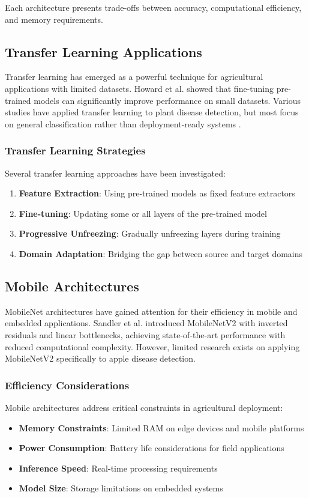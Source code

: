 \documentclass[conference,10pt,letterpaper]{IEEEtran}
\begin{document}
Each architecture presents trade-offs between accuracy, computational efficiency, and memory requirements.

\subsection{Transfer Learning Applications}

Transfer learning has emerged as a powerful technique for agricultural applications with limited datasets. Howard et al. \cite{ref6} showed that fine-tuning pre-trained models can significantly improve performance on small datasets. Various studies have applied transfer learning to plant disease detection, but most focus on general classification rather than deployment-ready systems \cite{ref7}.

\subsubsection{Transfer Learning Strategies}
Several transfer learning approaches have been investigated:
\begin{enumerate}
\item \textbf{Feature Extraction}: Using pre-trained models as fixed feature extractors
\item \textbf{Fine-tuning}: Updating some or all layers of the pre-trained model
\item \textbf{Progressive Unfreezing}: Gradually unfreezing layers during training
\item \textbf{Domain Adaptation}: Bridging the gap between source and target domains
\end{enumerate}

\subsection{Mobile Architectures}

MobileNet architectures have gained attention for their efficiency in mobile and embedded applications. Sandler et al. \cite{ref8} introduced MobileNetV2 with inverted residuals and linear bottlenecks, achieving state-of-the-art performance with reduced computational complexity. However, limited research exists on applying MobileNetV2 specifically to apple disease detection.

\subsubsection{Efficiency Considerations}
Mobile architectures address critical constraints in agricultural deployment:
\begin{itemize}
\item \textbf{Memory Constraints}: Limited RAM on edge devices and mobile platforms
\item \textbf{Power Consumption}: Battery life considerations for field applications
\item \textbf{Inference Speed}: Real-time processing requirements
\item \textbf{Model Size}: Storage limitations on embedded systems
\end{itemize}
\end{document}
